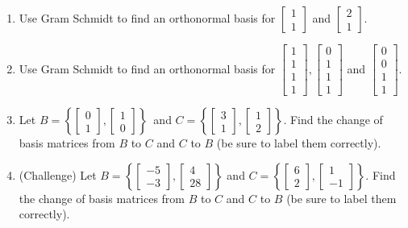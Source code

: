 \documentclass[10pt]{book}
\theoremstyle{definition}
\theoremstyle{remark}
\begin{document}
\begin{large}
\begin{enumerate}
\item Use Gram Schmidt to find an orthonormal basis for  $\begin{bmatrix} 1 \\ 1 \end{bmatrix}$ and $\begin{bmatrix}2 \\ 1 \end{bmatrix}$.\vfil\vfil
\item Use Gram Schmidt to find an orthonormal basis for  $\begin{bmatrix} 1 \\ 1 \\ 1 \\ 1 \end{bmatrix}, \begin{bmatrix} 0 \\1 \\ 1 \\ 1 \end{bmatrix}$ and $\begin{bmatrix}0 \\ 0 \\ 1 \\ 1 \end{bmatrix}$.\vfil
\newpage

\item Let $B = \left\{\begin{bmatrix} 0 \\ 1 \end{bmatrix}, \begin{bmatrix}1 \\ 0 \end{bmatrix}\right \}$\ and $C = \left\{\begin{bmatrix} 3 \\ 1 \end{bmatrix}, \begin{bmatrix}1 \\ 2 \end{bmatrix} \right\}$. Find the change of basis matrices from $B$ to $C$ and $C$ to $B$ (be sure to label them correctly). \vfil\vfil
\item (Challenge) Let $B =\left \{\begin{bmatrix} -5 \\ -3 \end{bmatrix}, \begin{bmatrix}4 \\ 28 \end{bmatrix} \right\}$ and $C =\left \{\begin{bmatrix} 6 \\ 2\end{bmatrix}, \begin{bmatrix}1 \\ -1 \end{bmatrix} \right\}$. Find the change of basis matrices from $B$ to $C$ and $C$ to $B$ (be sure to label them correctly).\vfil

\end{enumerate}
\end{large}
\newpage
\end{document}
